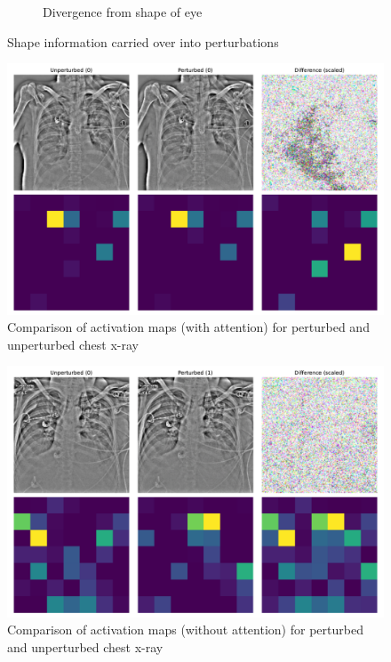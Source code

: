 \documentclass[10pt,twocolumn,letterpaper]{article}
\begin{document}
\begin{figure}[h]
\begin{subfigure}{.4\linewidth}
            \caption{Divergence from shape of eye\\}
            \label{EyeShapeDivergence}
          \end{subfigure}
          \caption{Shape information carried over into perturbations}
        \end{figure}

        \begin{figure}[h]
          \centering
          \includegraphics[width=\linewidth]{graphics/ResNet-50/pneumo_with_attention.pdf}
          \caption{Comparison of activation maps (with attention) for perturbed and unperturbed chest x-ray}
          \label{PneumoWithAttention}
        \end{figure}

        \begin{figure}[h]
          \centering
          \includegraphics[width=\linewidth]{graphics/ResNet-50/different_maps.pdf}
          \caption{Comparison of activation maps (without attention) for perturbed and unperturbed chest x-ray}
          \label{DifferentMaps}
        \end{figure}
\end{document}
